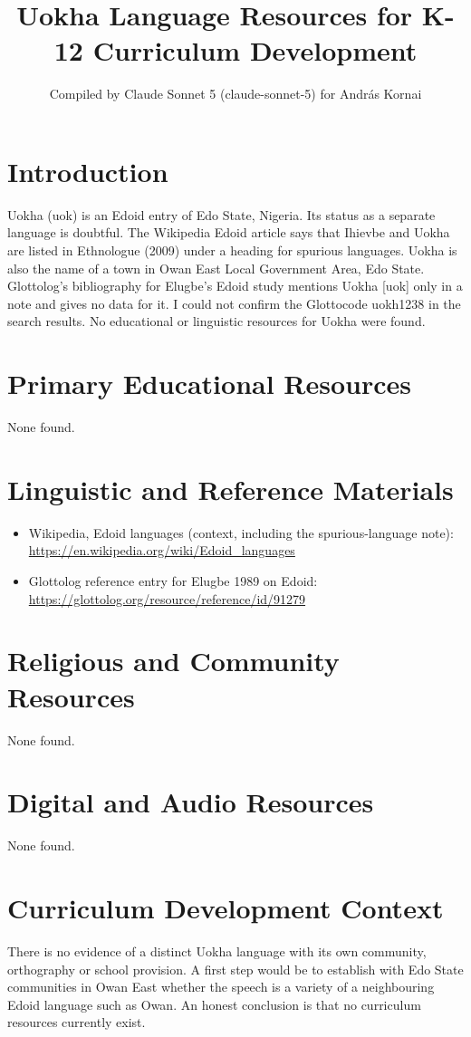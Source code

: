\documentclass[12pt]{article}
\title{Uokha Language Resources for K-12 Curriculum Development}
\author{Compiled by Claude Sonnet 5 (claude-sonnet-5) for Andr\'as Kornai}
\date{}
\begin{document}
\maketitle

\section{Introduction}
Uokha (uok) is an Edoid entry of Edo State, Nigeria. Its status as a separate language is doubtful. The Wikipedia Edoid article says that Ihievbe and Uokha are listed in Ethnologue (2009) under a heading for spurious languages. Uokha is also the name of a town in Owan East Local Government Area, Edo State. Glottolog's bibliography for Elugbe's Edoid study mentions Uokha [uok] only in a note and gives no data for it. I could not confirm the Glottocode uokh1238 in the search results. No educational or linguistic resources for Uokha were found.

\section{Primary Educational Resources}
None found.

\section{Linguistic and Reference Materials}
\begin{itemize}
\item Wikipedia, Edoid languages (context, including the spurious-language note): \url{https://en.wikipedia.org/wiki/Edoid_languages}
\item Glottolog reference entry for Elugbe 1989 on Edoid: \url{https://glottolog.org/resource/reference/id/91279}
\end{itemize}

\section{Religious and Community Resources}
None found.

\section{Digital and Audio Resources}
None found.

\section{Curriculum Development Context}
There is no evidence of a distinct Uokha language with its own community, orthography or school provision. A first step would be to establish with Edo State communities in Owan East whether the speech is a variety of a neighbouring Edoid language such as Owan. An honest conclusion is that no curriculum resources currently exist.
\end{document}
